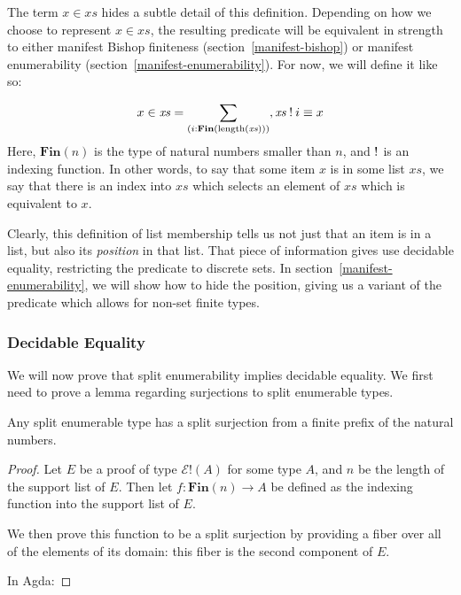 The term \(x \in \mathit{xs}\) hides a subtle detail of this definition.
Depending on how we choose to represent \(x \in \mathit{xs}\), the resulting
predicate will be equivalent in strength to either manifest Bishop finiteness
(section~\ref{manifest-bishop}) or manifest enumerability
(section~\ref{manifest-enumerability}).
For now, we will define it like so:

\begin{definition} \label{list-membership}
  \begin{equation}
    x \in \mathit{xs} = \sum_{(i : \mathbf{Fin}(\text{length}(\mathit{xs})))} , \mathit{xs} \mathbin{!} i \equiv x
  \end{equation}
  Here, \(\mathbf{Fin}(n)\) is the type of natural numbers smaller than \(n\),
  and \(\mathbin{!}\) is an indexing function.
  In other words, to say that some item \(x\) is in some list \(\mathit{xs}\),
  we say that there is an index into \(\mathit{xs}\) which selects an element of
  \(\mathit{xs}\) which is equivalent to \(x\).
\end{definition}

Clearly, this definition of list membership tells us not just that an item is in
a list, but also its \emph{position} in that list.
That piece of information gives use decidable equality, restricting the
predicate to discrete sets.
In section~\ref{manifest-enumerability}, we will show how to hide the position,
giving us a variant of the predicate which allows for non-set finite types.
\subsubsection{Decidable Equality}
We will now prove that split enumerability implies decidable equality.
We first need to prove a lemma regarding surjections to split enumerable types.
\begin{lemma} \label{split-enum-surj}
  Any split enumerable type has a split surjection from a finite prefix of the
  natural numbers.
\end{lemma}
\begin{proof} 
  Let \(E\) be a proof of type \(\mathcal{E}!(A)\) for some type \(A\), and
  \(n\) be the length of the support list of \(E\).
  Then let \(f : \textbf{Fin}(n) \rightarrow A\) be defined as the indexing
  function into the support list of \(E\).

  We then prove this function to be a split surjection by providing a fiber over
  all of the elements of its domain: this fiber is the second component of \(E\).

  In Agda:
\end{proof}

